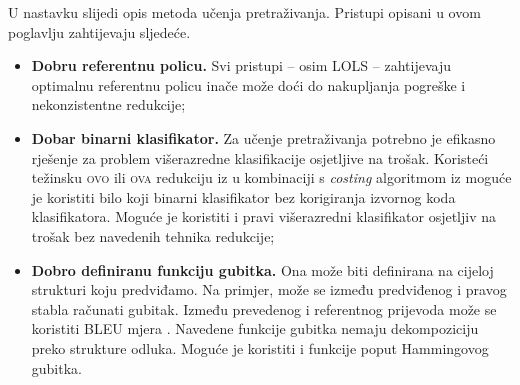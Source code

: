 U nastavku slijedi opis metoda učenja pretraživanja. Pristupi opisani u ovom
poglavlju zahtijevaju sljedeće.

\begin{itemize}

  \item \textbf{Dobru referentnu policu.} Svi pristupi -- osim \textsc{LOLS} --
  zahtijevaju optimalnu referentnu policu inače može doći do nakupljanja
  pogreške  i nekonzistentne redukcije;

  \item \textbf{Dobar binarni klasifikator.} Za učenje pretraživanja potrebno je
  efikasno rješenje za problem višerazredne klasifikacije osjetljive na trošak.
  Koristeći težinsku \textsc{ovo} ili \textsc{ova}  redukciju iz \citep{beygelzimer2005weighted,
  beygelzimer2005error} u kombinaciji s \textit{costing} algoritmom iz
  \citep{zadrozny2003cost} moguće je koristiti bilo koji binarni klasifikator
  bez korigiranja izvornog koda klasifikatora. Moguće je koristiti i pravi
  višerazredni klasifikator osjetljiv na trošak bez navedenih tehnika redukcije;

  \item \textbf{Dobro definiranu funkciju gubitka.} Ona može biti definirana na
  cijeloj strukturi koju predviđamo. Na primjer, može se između predviđenog i
  pravog stabla računati  gubitak. Između prevedenog i
  referentnog prijevoda može se koristiti BLEU mjera . Navedene funkcije gubitka nemaju dekompoziciju preko
  strukture odluka. Moguće je koristiti i funkcije poput Hammingovog gubitka.

\end{itemize}
